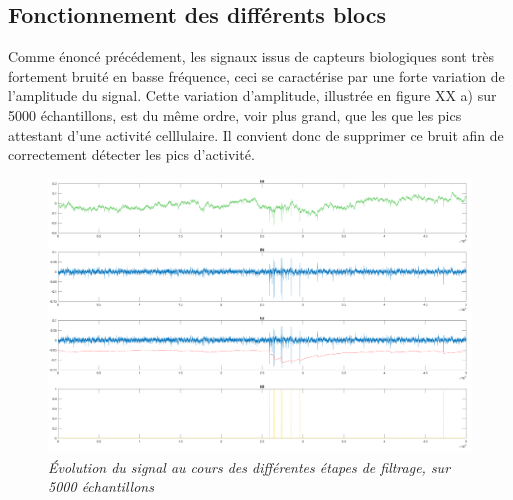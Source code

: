 \documentclass[a4paper,12pt]{article}
\begin{document}
\subsection{Fonctionnement des différents blocs}
Comme énoncé précédement, les signaux issus de capteurs biologiques sont très fortement bruité en basse fréquence, ceci se caractérise par une forte variation de l'amplitude du signal. Cette variation d'amplitude, illustrée en figure XX a) sur 5000 échantillons, est du même ordre, voir plus grand, que les que les pics attestant d'une activité celllulaire. Il convient donc de supprimer ce bruit afin de correctement détecter les pics d'activité.\\

\begin{figure}[H]
\centering
\includegraphics[scale=0.18, keepaspectratio]{toto2.png}
\caption{\textit{Évolution du signal au cours des différentes étapes de filtrage, sur 5000 échantillons}}
\end{figure}
\end{document}
